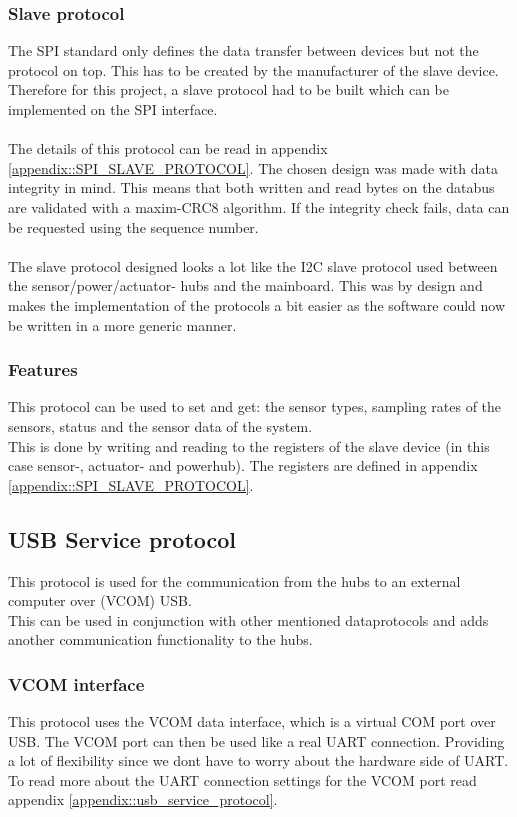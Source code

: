 \subsubsection{Slave protocol}
The SPI standard only defines the data transfer between devices but not the protocol on top. This has to be created by the manufacturer of the slave device. Therefore for this project, a slave protocol had to be built which can be implemented on the SPI interface.\\\\
The details of this protocol can be read in appendix \ref{appendix::SPI_SLAVE_PROTOCOL}. The chosen design was made with data integrity in mind. This means that both written and read bytes on the databus are validated with a maxim-CRC8 algorithm. If the integrity check fails, data can be requested using the sequence number. \\\\
The slave protocol designed looks a lot like the I2C slave protocol used between the sensor/power/actuator- hubs and the mainboard. This was by design and makes the implementation of the protocols a bit easier as the software could now be written in a more generic manner. \\
\pagebreak
\subsubsection{Features}
This protocol can be used to set and get: the sensor types, sampling rates of the sensors, status and the sensor data of the system. \\ This is done by writing and reading to the registers of the slave device (in this case sensor-, actuator- and powerhub). The registers are defined in appendix \ref{appendix::SPI_SLAVE_PROTOCOL}.

\subsection{USB Service protocol}
This protocol is used for the communication from the hubs to an external computer over (VCOM) USB.\\ This can be used in conjunction with other mentioned dataprotocols and adds another communication functionality to the hubs.\\

\subsubsection{VCOM interface}
This protocol uses the VCOM data interface, which is a virtual COM port over USB. The VCOM port can then be used like a real UART connection. Providing a lot of flexibility since we dont have to worry about the hardware side of UART. To read more about the UART connection settings for the VCOM port read appendix \ref{appendix::usb_service_protocol}.


